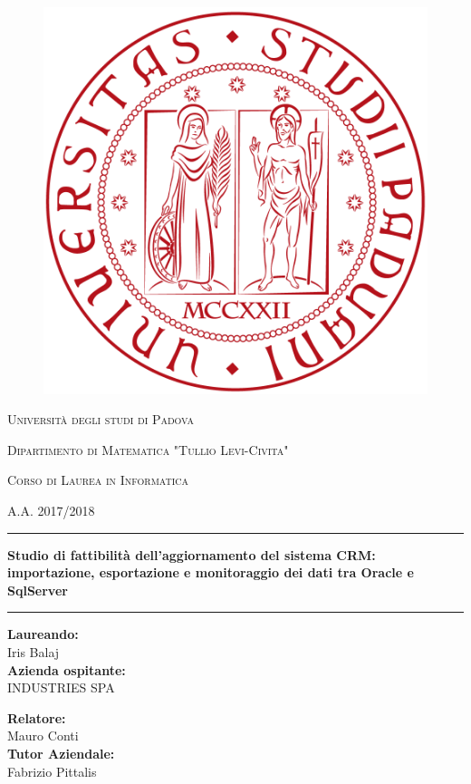 \begin{figure}[!h]
\thispagestyle{empty}
\centering
\includegraphics[scale=0.20]{img/LogoPadova.png}
\end{figure}
\vspace{8mm}

\centerline{\LARGE \textsc{Università degli studi di Padova}}
\vspace{2mm}
\centerline{\large \textsc{Dipartimento di Matematica "Tullio Levi-Civita"}}

\vspace{10mm}
\centerline{\normalsize \textsc{Corso di Laurea in Informatica}}
\centerline{\normalsize \textsc{A.A. 2017/2018}}

\vspace{8mm}
\par\noindent\rule{150mm}{2pt}

\begin{center}
\Large \textbf{Studio di fattibilità dell'aggiornamento del sistema CRM: importazione, esportazione e monitoraggio dei dati tra Oracle e SqlServer}
\end{center}

\par\noindent\rule{150mm}{2pt}

\vspace{7mm}
\begin{minipage}{2in}
\textbf{Laureando:} \\
Iris Balaj \\
\newline
\textbf{Azienda ospitante:} \\
INDUSTRIES SPA
\end{minipage}
\hfill
\begin{minipage}{2in}
\textbf{Relatore:} \\
Mauro Conti \\
\newline
\textbf{Tutor Aziendale:} \\
Fabrizio Pittalis
\end{minipage}